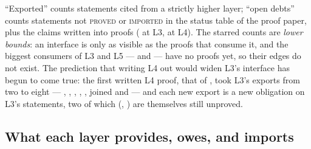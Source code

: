 ``Exported'' counts statements cited from a strictly higher layer;
``open debts'' counts statements not \textsc{proved} or \textsc{imported} in
the status table of the proof paper, plus the claims written into proofs
( at L3,  at L4). The starred
counts are \emph{lower bounds}: an interface is only as visible as the proofs
that consume it, and the biggest consumers of L3 and L5 ---
 and  --- have no proofs
yet, so their edges do not exist. The prediction that writing L4 out would
widen L3's interface has begun to come true: the first written L4 proof, that
of , took L3's exports from two to eight
--- , ,
, ,
,
 joined  and
 --- and each new export is a new obligation on L3's
statements, two of which (,
) are themselves still unproved.

\subsection{What each layer provides, owes, and imports}

